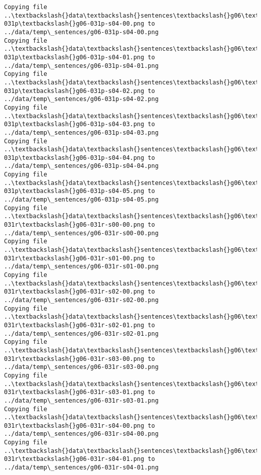\documentclass[11pt]{article}
\begin{document}
\begin{Verbatim}[commandchars=\\\{\}]
Copying file ..\textbackslash{}data\textbackslash{}sentences\textbackslash{}g06\textbackslash{}g06-031p\textbackslash{}g06-031p-s04-00.png to
../data/temp\_sentences/g06-031p-s04-00.png
Copying file ..\textbackslash{}data\textbackslash{}sentences\textbackslash{}g06\textbackslash{}g06-031p\textbackslash{}g06-031p-s04-01.png to
../data/temp\_sentences/g06-031p-s04-01.png
Copying file ..\textbackslash{}data\textbackslash{}sentences\textbackslash{}g06\textbackslash{}g06-031p\textbackslash{}g06-031p-s04-02.png to
../data/temp\_sentences/g06-031p-s04-02.png
Copying file ..\textbackslash{}data\textbackslash{}sentences\textbackslash{}g06\textbackslash{}g06-031p\textbackslash{}g06-031p-s04-03.png to
../data/temp\_sentences/g06-031p-s04-03.png
Copying file ..\textbackslash{}data\textbackslash{}sentences\textbackslash{}g06\textbackslash{}g06-031p\textbackslash{}g06-031p-s04-04.png to
../data/temp\_sentences/g06-031p-s04-04.png
Copying file ..\textbackslash{}data\textbackslash{}sentences\textbackslash{}g06\textbackslash{}g06-031p\textbackslash{}g06-031p-s04-05.png to
../data/temp\_sentences/g06-031p-s04-05.png
Copying file ..\textbackslash{}data\textbackslash{}sentences\textbackslash{}g06\textbackslash{}g06-031r\textbackslash{}g06-031r-s00-00.png to
../data/temp\_sentences/g06-031r-s00-00.png
Copying file ..\textbackslash{}data\textbackslash{}sentences\textbackslash{}g06\textbackslash{}g06-031r\textbackslash{}g06-031r-s01-00.png to
../data/temp\_sentences/g06-031r-s01-00.png
Copying file ..\textbackslash{}data\textbackslash{}sentences\textbackslash{}g06\textbackslash{}g06-031r\textbackslash{}g06-031r-s02-00.png to
../data/temp\_sentences/g06-031r-s02-00.png
Copying file ..\textbackslash{}data\textbackslash{}sentences\textbackslash{}g06\textbackslash{}g06-031r\textbackslash{}g06-031r-s02-01.png to
../data/temp\_sentences/g06-031r-s02-01.png
Copying file ..\textbackslash{}data\textbackslash{}sentences\textbackslash{}g06\textbackslash{}g06-031r\textbackslash{}g06-031r-s03-00.png to
../data/temp\_sentences/g06-031r-s03-00.png
Copying file ..\textbackslash{}data\textbackslash{}sentences\textbackslash{}g06\textbackslash{}g06-031r\textbackslash{}g06-031r-s03-01.png to
../data/temp\_sentences/g06-031r-s03-01.png
Copying file ..\textbackslash{}data\textbackslash{}sentences\textbackslash{}g06\textbackslash{}g06-031r\textbackslash{}g06-031r-s04-00.png to
../data/temp\_sentences/g06-031r-s04-00.png
Copying file ..\textbackslash{}data\textbackslash{}sentences\textbackslash{}g06\textbackslash{}g06-031r\textbackslash{}g06-031r-s04-01.png to
../data/temp\_sentences/g06-031r-s04-01.png

\end{Verbatim}
\end{document}
